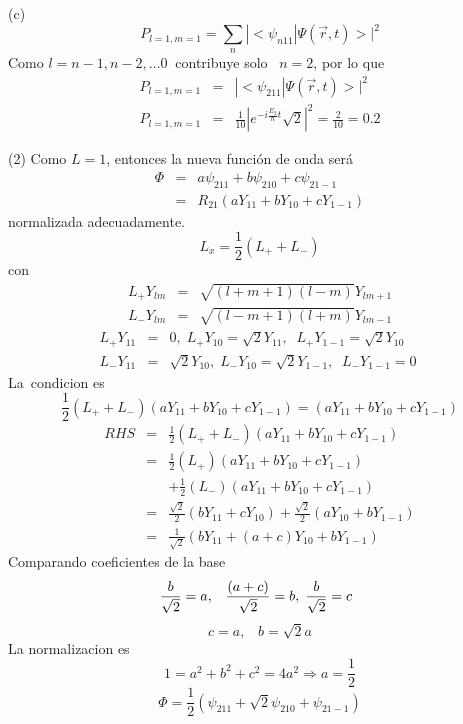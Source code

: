 (c)%
\[
P_{l=1,m=1}=\sum_{n}|<\psi _{n11}|\Psi (\vec{r},t)>|^{2}
\]%
Como $l=n-1,n-2,...0\;\;$contribuye solo \ $n=2$, por lo que 
\begin{eqnarray*}
P_{l=1,m=1} &=&|<\psi _{211}|\Psi (\vec{r},t)>|^{2} \\
P_{l=1,m=1} &=&\frac{1}{10}|e^{-i\frac{E_{2}}{\hbar }t}\sqrt{2}|^{2}=\frac{2%
}{10}=0.2
\end{eqnarray*}


(2) Como $L=1$,  entonces la nueva funci\'on de onda ser\'a 
\begin{eqnarray*}
\Phi  &=&a\psi _{211}+b\psi _{210}+c\psi _{21-1} \\
&=&R_{21}\left( aY_{11}+bY_{10}+cY_{1-1}\right) 
\end{eqnarray*}%
normalizada adecuadamente.%
\[
L_{x}=\frac{1}{2}\left( L_{+}+L_{-}\right) 
\]%
con%
\begin{eqnarray*}
L_{+}Y_{lm} &=&\sqrt{\left( l+m+1\right) \left( l-m\right) }Y_{lm+1} \\
L_{-}Y_{lm} &=&\sqrt{\left( l-m+1\right) \left( l+m\right) }Y_{lm-1}
\end{eqnarray*}%
\begin{eqnarray*}
L_{+}Y_{11} &=&0,\;L_{+}Y_{10}=\sqrt{2}Y_{11},\;\;L_{+}Y_{1-1}=\sqrt{2}%
Y_{10}\; \\
L_{-}Y_{11} &=&\sqrt{2}Y_{10},\;L_{-}Y_{10}=\sqrt{2}Y_{1-1},\;%
\;L_{-}Y_{1-1}=0\;
\end{eqnarray*}%
La\ condicion es 
\[
\frac{1}{2}\left( L_{+}+L_{-}\right) \left( aY_{11}+bY_{10}+cY_{1-1}\right)
=\left( aY_{11}+bY_{10}+cY_{1-1}\right) 
\]%
\begin{eqnarray*}
RHS &=&\frac{1}{2}\left( L_{+}+L_{-}\right) \left(
aY_{11}+bY_{10}+cY_{1-1}\right)  \\
&=&\frac{1}{2}\left( L_{+}\right) \left( aY_{11}+bY_{10}+cY_{1-1}\right)  \\
&&+\frac{1}{2}\left( L_{-}\right) \left( aY_{11}+bY_{10}+cY_{1-1}\right)  \\
&=&\frac{\sqrt{2}}{2}\left( bY_{11}+cY_{10}\right) +\frac{\sqrt{2}}{2}\left(
aY_{10}+bY_{1-1}\right)  \\
&=&\frac{1}{\sqrt{2}}\left( bY_{11}+\left( a+c\right) Y_{10}+bY_{1-1}\right) 
\end{eqnarray*}%
Comparando coeficientes de la base%
\[
\frac{b}{\sqrt{2}}=a,\;\;\;\frac{\left( a+c\right) }{\sqrt{2}}=b,\;\frac{b}{%
\sqrt{2}}=c\;\;
\]%
\[
c=a,\;\;\;b=\sqrt{2}a
\]%
La normalizacion es%
\[
1=a^{2}+b^{2}+c^{2}=4a^{2}\Longrightarrow a=\frac{1}{2}
\]%
\[
\Phi =\frac{1}{2}\left( \psi _{211}+\sqrt{2}\psi _{210}+\psi _{21-1}\right) 
\]


